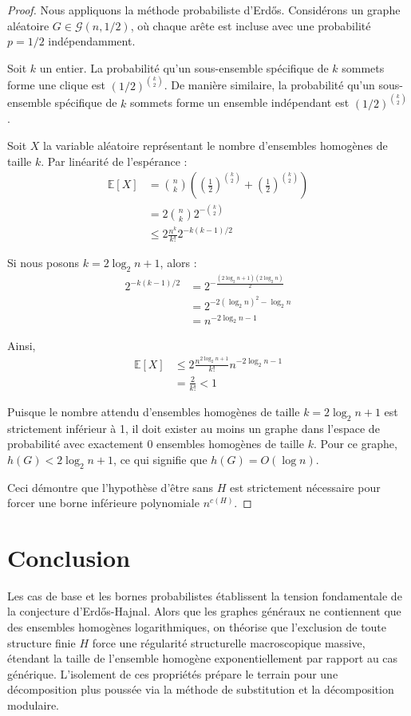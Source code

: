 \documentclass[12pt, a4paper]{article}
\begin{document}
\begin{proof}
Nous appliquons la méthode probabiliste d'Erd\H{o}s. Considérons un graphe aléatoire $G \in \mathcal{G}(n, 1/2)$, où chaque arête est incluse avec une probabilité $p = 1/2$ indépendamment.

Soit $k$ un entier. La probabilité qu'un sous-ensemble spécifique de $k$ sommets forme une clique est $(1/2)^{\binom{k}{2}}$.
De manière similaire, la probabilité qu'un sous-ensemble spécifique de $k$ sommets forme un ensemble indépendant est $(1/2)^{\binom{k}{2}}$.

Soit $X$ la variable aléatoire représentant le nombre d'ensembles homogènes de taille $k$. Par linéarité de l'espérance :
\begin{align*}
\mathbb{E}[X] &= \binom{n}{k} \left( \left(\frac{1}{2}\right)^{\binom{k}{2}} + \left(\frac{1}{2}\right)^{\binom{k}{2}} \right) \\
&= 2 \binom{n}{k} 2^{-\binom{k}{2}} \\
&\leq 2 \frac{n^k}{k!} 2^{-k(k-1)/2}
\end{align*}

Si nous posons $k = 2 \log_2 n + 1$, alors :
\begin{align*}
2^{-k(k-1)/2} &= 2^{-\frac{(2 \log_2 n + 1)(2 \log_2 n)}{2}} \\
&= 2^{-2(\log_2 n)^2 - \log_2 n} \\
&= n^{-2\log_2 n - 1}
\end{align*}

Ainsi,
\begin{align*}
\mathbb{E}[X] &\leq 2 \frac{n^{2\log_2 n + 1}}{k!} n^{-2\log_2 n - 1} \\
&= \frac{2}{k!} < 1
\end{align*}

Puisque le nombre attendu d'ensembles homogènes de taille $k = 2\log_2 n + 1$ est strictement inférieur à 1, il doit exister au moins un graphe dans l'espace de probabilité avec exactement 0 ensembles homogènes de taille $k$.
Pour ce graphe, $h(G) < 2 \log_2 n + 1$, ce qui signifie que $h(G) = O(\log n)$.

Ceci démontre que l'hypothèse d'être sans $H$ est strictement nécessaire pour forcer une borne inférieure polynomiale $n^{c(H)}$.
\end{proof}

\section{Conclusion}

Les cas de base et les bornes probabilistes établissent la tension fondamentale de la conjecture d'Erd\H{o}s-Hajnal. Alors que les graphes généraux ne contiennent que des ensembles homogènes logarithmiques, on théorise que l'exclusion de toute structure finie $H$ force une régularité structurelle macroscopique massive, étendant la taille de l'ensemble homogène exponentiellement par rapport au cas générique. L'isolement de ces propriétés prépare le terrain pour une décomposition plus poussée via la méthode de substitution et la décomposition modulaire.
\end{document}
